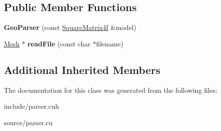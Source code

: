 \subsection*{Public Member Functions}
\begin{DoxyCompactItemize}
\item 
{\bfseries Geo\+Parser} (const \hyperlink{class_square_matrix4}{Square\+Matrix4f} \&model)\hypertarget{class_geo_parser_af14296dc060f9fa0625a5c242d6bd2b3}{}\label{class_geo_parser_af14296dc060f9fa0625a5c242d6bd2b3}

\item 
\hyperlink{class_mesh}{Mesh} $\ast$ {\bfseries read\+File} (const char $\ast$filename)\hypertarget{class_geo_parser_aa3d5d255307c7d3d8f59a91c9656758c}{}\label{class_geo_parser_aa3d5d255307c7d3d8f59a91c9656758c}

\end{DoxyCompactItemize}
\subsection*{Additional Inherited Members}


The documentation for this class was generated from the following files\+:\begin{DoxyCompactItemize}
\item 
include/parser.\+cuh\item 
source/parser.\+cu\end{DoxyCompactItemize}
